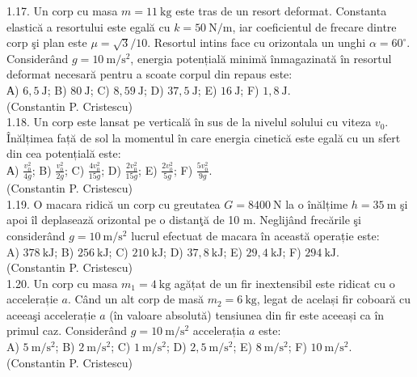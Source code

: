 \documentclass[10pt]{article}
\begin{document}
1.17. Un corp cu masa $m=11 \mathrm{~kg}$ este tras de un resort deformat. Constanta elastică a resortului este egală cu $k=50 \mathrm{~N} / \mathrm{m}$, iar coeficientul de frecare dintre corp şi plan este $\mu=\sqrt{3} / 10$. Resortul intins face cu orizontala un unghi $\alpha=60^{\circ}$. Considerând $g=10 \mathrm{~m} / \mathrm{s}^{2}$, energia potențială minimă înmagazinată în resortul deformat necesară pentru a scoate corpul din repaus este:\\ А) $6,5 \mathrm{~J}$; B) $80 \mathrm{~J}$; C) $8,59 \mathrm{~J}$; D) $37,5 \mathrm{~J}$; E) $16 \mathrm{~J}$; F) $1,8 \mathrm{~J}$.\\ (Constantin P. Cristescu)\\

1.18. Un corp este lansat pe verticală în sus de la nivelul solului cu viteza $v_{0}$. Înălțimea față de sol la momentul în care energia cinetică este egală cu un sfert din cea potențială este:\\ А) $\frac{v_{0}^{2}}{4 g}$; B) $\frac{v_{0}^{2}}{2 g}$; C) $\frac{4 v_{0}^{2}}{15 g}$; D) $\frac{2 v_{0}^{2}}{15 g}$; E) $\frac{2 v_{0}^{2}}{5 g}$; F) $\frac{5 v_{0}^{2}}{9 g}$.\\ (Constantin P. Cristescu)\\

1.19. O macara ridică un corp cu greutatea $G=8400 \mathrm{~N}$ la o înălțime $h=35 \mathrm{~m}$ şi apoi îl deplasează orizontal pe o distanţă de 10 m. Neglijând frecările şi considerând $g=10 \mathrm{~m} / \mathrm{s}^{2}$ lucrul efectuat de macara în această operație este:\\ A) $378 \mathrm{~kJ}$; B) $256 \mathrm{~kJ}$; C) $210 \mathrm{~kJ}$; D) $37,8 \mathrm{~kJ}$; E) $29,4 \mathrm{~kJ}$; F) $294 \mathrm{~kJ}$.\\ (Constantin P. Cristescu)\\

1.20. Un corp cu masa $m_{1}=4 \mathrm{~kg}$ agățat de un fir inextensibil este ridicat cu o accelerație $a$. Când un alt corp de masă $m_{2}=6 \mathrm{~kg}$, legat de același fir coboară cu aceeaşi accelerație $a$ (în valoare absolută) tensiunea din fir este aceeași ca în primul caz. Considerând $g=10 \mathrm{~m} / \mathrm{s}^{2}$ accelerația $a$ este:\\ A) $5 \mathrm{~m} / \mathrm{s}^{2}$; B) $2 \mathrm{~m} / \mathrm{s}^{2}$; C) $1 \mathrm{~m} / \mathrm{s}^{2}$; D) $2,5 \mathrm{~m} / \mathrm{s}^{2}$; E) $8 \mathrm{~m} / \mathrm{s}^{2}$; F) $10 \mathrm{~m} / \mathrm{s}^{2}$.\\ (Constantin P. Cristescu)\\
\end{document}
